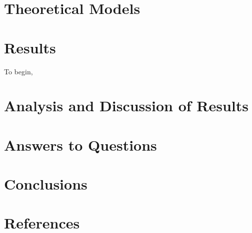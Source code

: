 \documentclass{article}
\begin{document}
\section{Theoretical Models}

\section{Results}
To begin, 
\section{Analysis and Discussion of Results}

\section{Answers to Questions}

\section{Conclusions}

\section{References}
\end{document}
